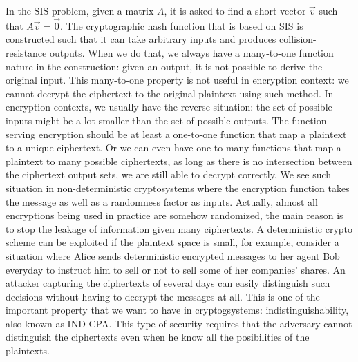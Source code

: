 \begin{description}
            In the SIS problem, given a matrix $A$, it is asked to find
            a short vector $\vec{v}$ such that $A\vec{v} = \vec{0}$. The
            cryptographic hash function that is based on SIS
            is constructed such that it can take arbitrary inputs and produces
            collision-resistance outputs. When we do that, we always have a
            many-to-one
            function nature in the construction:
            given an output, it is not possible to derive the original
            input. This many-to-one property is not useful in encryption
            context: we cannot decrypt the ciphertext to the original plaintext
            using such method. In encryption contexts, we usually have the
            reverse situation: the set of possible inputs might be a lot smaller
            than the set of possible outputs. The function serving encryption
            should be at least a one-to-one function that map a plaintext to a unique
            ciphertext. Or we can even have one-to-many functions that map a
            plaintext to many possible ciphertexts, as long as there is no
            intersection between the ciphertext output sets, we are still able
            to decrypt correctly. We see such situation in non-deterministic
            cryptosystems where the encryption function takes the message as
            well as a randomness factor as inputs. Actually, almost all
            encryptions being used in practice are somehow randomized, the main
            reason is to stop the leakage of
            information given many ciphertexts. A deterministic crypto scheme
            can be exploited if the plaintext space is small, for example,
            consider a situation where Alice sends deterministic encrypted
            messages
            to her
            agent Bob
            everyday to instruct him to sell or not to sell some of her
            companies' shares.
            An attacker capturing the ciphertexts of several days can easily
            distinguish such
            decisions without having to decrypt the messages at all. This is one
            of the important property that we want to have in cryptogsystems:
            indistinguishability, also known as IND-CPA. This type of security
            requires that the adversary cannot distinguish the ciphertexts even
            when he know all the posibilities of the plaintexts.


\end{description}
